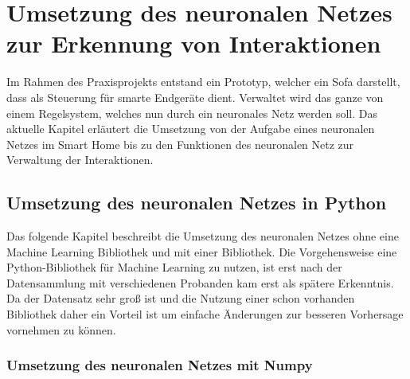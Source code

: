\chapter{Umsetzung des neuronalen Netzes zur Erkennung von Interaktionen}
Im Rahmen des Praxisprojekts entstand ein Prototyp, welcher ein Sofa darstellt, dass als Steuerung für smarte Endgeräte dient. Verwaltet wird das ganze von einem Regelsystem, welches nun durch ein neuronales Netz werden soll. Das aktuelle Kapitel erläutert die Umsetzung von der Aufgabe eines neuronalen Netzes im Smart Home bis zu den Funktionen des neuronalen Netz zur Verwaltung der Interaktionen.

\section{Umsetzung des neuronalen Netzes in Python}
\label{sec:ums_nn}
Das folgende Kapitel beschreibt die Umsetzung des neuronalen Netzes ohne eine Machine Learning Bibliothek und mit einer Bibliothek. Die Vorgehensweise eine Python-Bibliothek für Machine Learning zu nutzen, ist erst nach der Datensammlung mit verschiedenen Probanden kam erst als spätere Erkenntnis. Da der Datensatz sehr groß ist und die Nutzung einer schon vorhanden Bibliothek daher ein Vorteil ist um einfache Änderungen zur besseren Vorhersage vornehmen zu können.

\subsection{Umsetzung des neuronalen Netzes mit Numpy}


